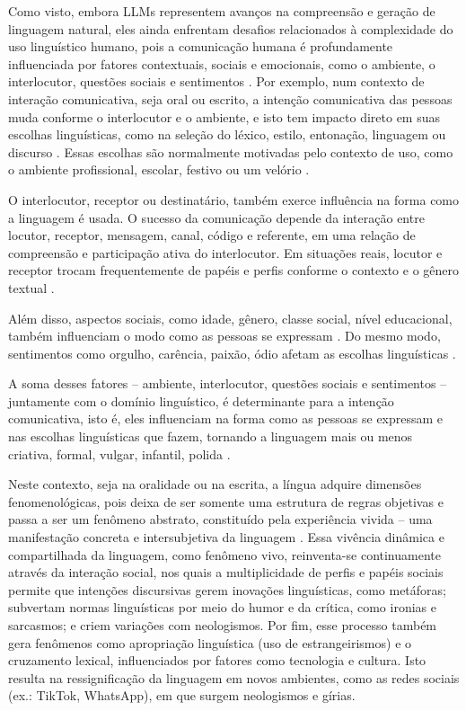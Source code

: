 \documentclass[portuguese]{textolivre}
\begin{document}
Como visto, embora LLMs representem avanços na compreensão e geração de linguagem natural, eles ainda enfrentam desafios relacionados à complexidade do uso linguístico humano, pois a comunicação humana é profundamente influenciada por fatores contextuais, sociais e emocionais, como o ambiente, o interlocutor, questões sociais e sentimentos \cite{labov2008, bagno2011, bakhtin2003}. Por exemplo, num contexto de interação comunicativa, seja oral ou escrito, a intenção comunicativa das pessoas muda conforme o interlocutor e o ambiente, e isto tem impacto direto em suas escolhas linguísticas, como na seleção do léxico, estilo, entonação, linguagem ou discurso \cite{bagno2011}. Essas escolhas são normalmente motivadas pelo contexto de uso, como o ambiente profissional, escolar, festivo ou um velório \cite{bakhtin2003, marcuschi2007, bronckart1999, dolz2004}.

O interlocutor, receptor ou destinatário, também exerce influência na forma como a linguagem é usada. O sucesso da comunicação depende da interação entre locutor, receptor, mensagem, canal, código e referente, em uma relação de compreensão e participação ativa do interlocutor. Em situações reais, locutor e receptor trocam frequentemente de papéis e perfis conforme o contexto e o gênero textual \cite{jakobson1976, bakhtin1997, saussure1999, marcuschi2007}.

Além disso, aspectos sociais, como idade, gênero, classe social, nível educacional, também influenciam o modo como as pessoas se expressam \cite{labov2008}. Do mesmo modo, sentimentos como orgulho, carência, paixão, ódio afetam as escolhas linguísticas \cite{bakhtin2003}.

A soma desses fatores -- ambiente, interlocutor, questões sociais e sentimentos -- juntamente com o domínio linguístico, é determinante para a intenção comunicativa, isto é, eles influenciam na forma como as pessoas se expressam e nas escolhas linguísticas que fazem, tornando a linguagem mais ou menos criativa, formal, vulgar, infantil, polida \cite{bagno2011, bakhtin2003}.

Neste contexto, seja na oralidade ou na escrita, a língua adquire dimensões fenomenológicas, pois deixa de ser somente uma estrutura de regras objetivas e passa a ser um fenômeno abstrato, constituído pela experiência vivida -- uma manifestação concreta e intersubjetiva da linguagem \cite{husserl1975, heidegger2012, merleau-ponty1999}. Essa vivência dinâmica e compartilhada da linguagem, como fenômeno vivo, reinventa-se continuamente através da interação social, nos quais a multiplicidade de perfis e papéis sociais permite que intenções discursivas gerem inovações linguísticas, como metáforas; subvertam normas linguísticas por meio do humor e da crítica, como ironias e sarcasmos; e criem variações com neologismos. Por fim, esse processo também gera fenômenos como apropriação linguística (uso de estrangeirismos) e o cruzamento lexical, influenciados por fatores como tecnologia e cultura. Isto resulta na ressignificação da linguagem em novos ambientes, como as redes sociais (ex.: TikTok, WhatsApp), em que surgem neologismos e gírias.
\end{document}
